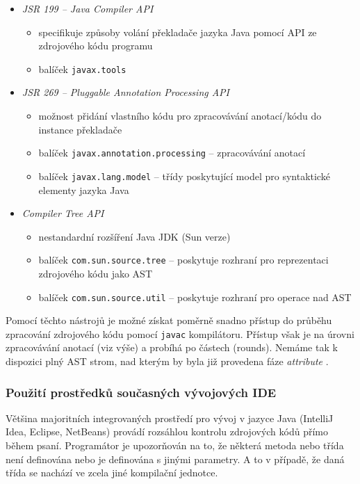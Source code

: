 \begin{itemize}
\item \emph{JSR 199 -- Java Compiler API} \cite{apidoc:javacompilerapi}
  \begin{itemize}
  \item specifikuje způsoby volání překladače jazyka Java pomocí API ze zdrojového kódu programu
  \item balíček \verb+javax.tools+
  \end{itemize}
\item \emph{JSR 269 -- Pluggable Annotation Processing API}
  \begin{itemize}
  \item možnost přidání vlastního kódu pro zpracovávání anotací/kódu do instance překladače
  \item balíček \verb+javax.annotation.processing+ -- zpracovávání anotací
  \item balíček \verb+javax.lang.model+ -- třídy poskytující model pro syntaktické elementy jazyka Java
  \end{itemize}
\item \emph{Compiler Tree API} \cite{parsertools:compilertreeapi}
  \begin{itemize}
  \item nestandardní rozšíření Java JDK (Sun verze)
  \item balíček \verb+com.sun.source.tree+ -- poskytuje rozhraní pro reprezentaci zdrojového kódu jako AST
  \item balíček \verb+com.sun.source.util+ -- poskytuje rozhraní pro operace nad AST
  \end{itemize}
\end{itemize}

Pomocí těchto nástrojů je možné získat poměrně snadno přístup do průběhu zpracování zdrojového kódu pomocí \verb+javac+ kompilátoru. Přístup však je na úrovni zpracovávání anotací (viz výše) a probíhá po částech (rounds). Nemáme tak k dispozici plný AST strom, nad kterým by byla již provedena fáze \emph{attribute} \cite{hackers_guide_to_javac}.

\subsubsection{Použití prostředků současných vývojových IDE}
Většina majoritních integrovaných prostředí pro vývoj v jazyce Java (IntelliJ Idea, Eclipse, NetBeans) provádí rozsáhlou kontrolu zdrojových kódů přímo během psaní. Programátor je upozorňován na to, že některá metoda nebo třída není definována nebo je definována s jinými parametry. A to v případě, že daná třída se nachází ve zcela jiné kompilační jednotce.

